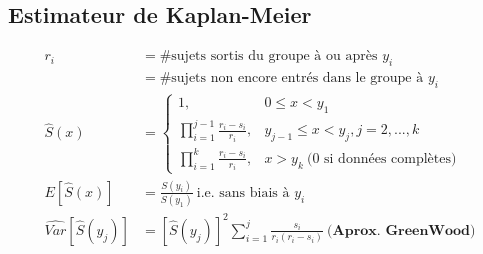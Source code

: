 \documentclass[french, landscape]{article}
\begin{document}
\begin{multicols*}{3}
\subsection*{Estimateur de Kaplan-Meier}
\begin{align*}
    r_i &= \text{\# sujets sortis du groupe à ou après $y_i$} \\
        &= \text{\# sujets non encore entrés dans le groupe à $y_i$} \\
    \hat{S}(x) &=
    \left\{
	\begin{array}{ll}
		1,  &  0 \leq x < y_1 \\
        \prod\limits_{i=1}^{j-1} \frac{r_i - s_i}{r_i}, &  y_{j-1} \leq x < y_j, j=2,...,k \\
        \prod\limits_{i=1}^{k} \frac{r_i - s_i}{r_i}, & x > y_k \: \text{(0 si données complètes)}
	\end{array}
    \right. \\
    E[\hat{S}(x)] &= \frac{S(y_i)}{S(y_1)}\: \text{i.e. sans biais à $y_i$} \\
    \widehat{Var}[\hat{S}(y_j)] &= [\hat{S}(y_j)]^2 \sum_{i=1}^j \frac{s_i}{r_i(r_i - s_i)}\: \textbf{(Aprox. GreenWood)}
\end{align*}
\end{multicols*}

\end{document}
